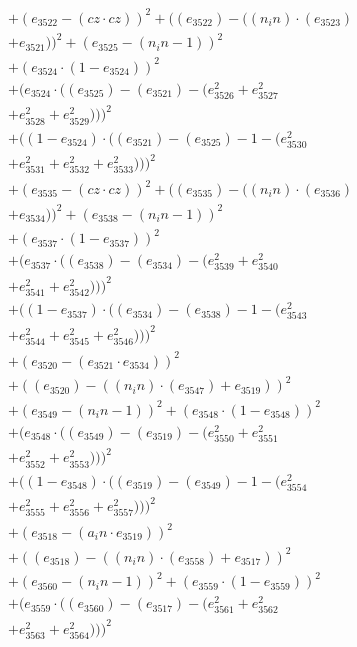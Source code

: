 \documentclass[10pt, a4paper]{article}
\begin{document}
\begin{align*}
& + (e_{3522} - (cz  \cdot  cz))^{2} + ((e_{3522}) - ((n_in)  \cdot  (e_{3523}) \\
& + e_{3521}))^{2} + (e_{3525} - (n_in - 1))^{2} \\
& + (e_{3524}  \cdot  (1 - e_{3524}))^{2} \\
& + (e_{3524}  \cdot  ((e_{3525}) - (e_{3521}) - (e_{3526}^{2} + e_{3527}^{2} \\
& + e_{3528}^{2} + e_{3529}^{2})))^{2} \\
& + ((1 - e_{3524})  \cdot  ((e_{3521}) - (e_{3525}) - 1 - (e_{3530}^{2} \\
& + e_{3531}^{2} + e_{3532}^{2} + e_{3533}^{2})))^{2} \\
& + (e_{3535} - (cz  \cdot  cz))^{2} + ((e_{3535}) - ((n_in)  \cdot  (e_{3536}) \\
& + e_{3534}))^{2} + (e_{3538} - (n_in - 1))^{2} \\
& + (e_{3537}  \cdot  (1 - e_{3537}))^{2} \\
& + (e_{3537}  \cdot  ((e_{3538}) - (e_{3534}) - (e_{3539}^{2} + e_{3540}^{2} \\
& + e_{3541}^{2} + e_{3542}^{2})))^{2} \\
& + ((1 - e_{3537})  \cdot  ((e_{3534}) - (e_{3538}) - 1 - (e_{3543}^{2} \\
& + e_{3544}^{2} + e_{3545}^{2} + e_{3546}^{2})))^{2} \\
& + (e_{3520} - (e_{3521}  \cdot  e_{3534}))^{2} \\
& + ((e_{3520}) - ((n_in)  \cdot  (e_{3547}) + e_{3519}))^{2} \\
& + (e_{3549} - (n_in - 1))^{2} + (e_{3548}  \cdot  (1 - e_{3548}))^{2} \\
& + (e_{3548}  \cdot  ((e_{3549}) - (e_{3519}) - (e_{3550}^{2} + e_{3551}^{2} \\
& + e_{3552}^{2} + e_{3553}^{2})))^{2} \\
& + ((1 - e_{3548})  \cdot  ((e_{3519}) - (e_{3549}) - 1 - (e_{3554}^{2} \\
& + e_{3555}^{2} + e_{3556}^{2} + e_{3557}^{2})))^{2} \\
& + (e_{3518} - (a_in  \cdot  e_{3519}))^{2} \\
& + ((e_{3518}) - ((n_in)  \cdot  (e_{3558}) + e_{3517}))^{2} \\
& + (e_{3560} - (n_in - 1))^{2} + (e_{3559}  \cdot  (1 - e_{3559}))^{2} \\
& + (e_{3559}  \cdot  ((e_{3560}) - (e_{3517}) - (e_{3561}^{2} + e_{3562}^{2} \\
& + e_{3563}^{2} + e_{3564}^{2})))^{2} \\

\end{align*}
\end{document}
